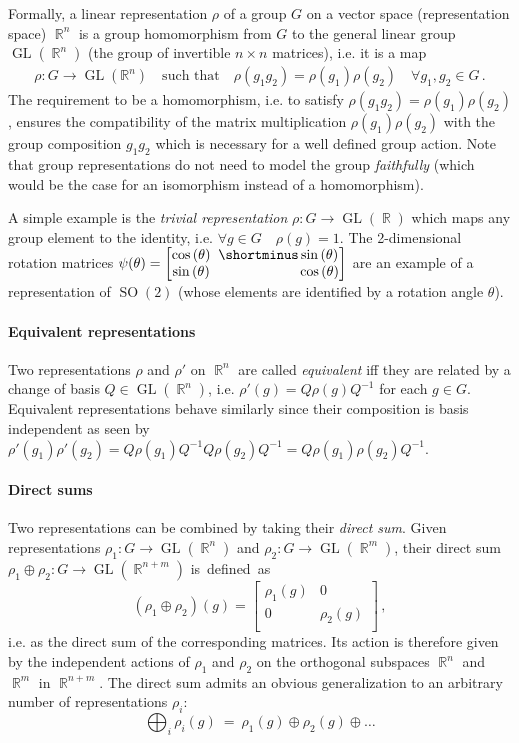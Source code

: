 \documentclass{article}
\newcommand{\lp}{\left(}
\newcommand{\rp}{\right)}
\DeclareMathOperator*{\R}{\mathbb{R}}
\newcommand{\GL}[1]{\ensuremath{\operatorname{GL}(#1)}}
\newcommand{\SO}[1]{\ensuremath{\operatorname{SO}(#1)}}
\newcommand{\PSI}[1]{
	\begin{bmatrix}
		\cos\lp#1\rp & \!\!\!         \shortminus \sin\lp#1\rp \\
		\sin\lp#1\rp & \!\!\!\phantom{\shortminus}\cos\lp#1\rp \\
	\end{bmatrix}
}
\begin{document}
Formally, a linear representation $\rho$ of a group $G$ on a vector space (representation space) $\R^n$ is a group homomorphism from $G$ to the general linear group $\GL{\R^n}$ (the group of invertible $n\times n$ matrices), i.e. it is a map
\begin{align*}
    \rho: G \to \operatorname{GL}(\mathbb{R}^n)
    \quad\text{such that}\quad
    \rho(g_1 g_2) = \rho(g_1) \rho(g_2) \quad \forall g_1, g_2 \in G \,.
\end{align*}
The requirement to be a homomorphism, i.e. to satisfy $\rho(g_1 g_2)=\rho(g_1)\rho(g_2)$, ensures the compatibility of the matrix multiplication $\rho(g_1)\rho(g_2)$ with the group composition $g_1 g_2$ which is necessary for a well defined group action.
Note that group representations do not need to model the group \textit{faithfully} (which would be the case for an isomorphism instead of a homomorphism).

A simple example is the \textit{trivial representation} $\rho:G\to\GL{\R}$ which maps any group element to the identity, i.e. $\forall g\in G\quad \rho(g)=1$.
The 2-dimensional rotation matrices $\psi(\theta)=\PSI{\theta}$ are an example of a representation of $\SO{2}$ (whose elements are identified by a rotation angle $\theta$).

\paragraph{Equivalent representations}
Two representations $\rho$ and $\rho'$ on $\R^n$ are called \textit{equivalent} iff they are related by a change of basis $Q\in\GL{\R^n}$, i.e. $\rho'(g) = Q \rho(g) Q^{-1}$ for each $g\in G$.
Equivalent representations behave similarly since their composition is basis independent as seen by $\rho'(g_1)\rho'(g_2) = Q\rho(g_1)Q^{-1}Q\rho(g_2)Q^{-1} = Q\rho(g_1)\rho(g_2)Q^{-1}$.

\paragraph{Direct sums}
Two representations can be combined by taking their \textit{direct sum}.
Given representations $\rho_1:G\to\GL{\R^n}$ and $\rho_2:G\to\GL{\R^m}$, their direct sum $\rho_1\oplus\rho_2:G\to\GL{\R^{n+m}}$ is~defined~as
\[
    (\rho_1 \oplus \rho_2)(g) = 
    \begin{bmatrix}
    \rho_1(g) & 0 		 \\
    0  		  & \rho_2(g)\\
    \end{bmatrix}\,,
\]
i.e. as the direct sum of the corresponding matrices.
Its action is therefore given by the independent actions of $\rho_1$ and $\rho_2$ on the orthogonal subspaces $\R^n$ and $\R^m$ in $\R^{n+m}$.
The direct sum admits an obvious generalization to an arbitrary number of representations $\rho_i$:
\[
    \bigoplus\nolimits_i \rho_i(g)\ =\ \rho_1(g) \oplus \rho_2(g) \oplus \dots
\]
\end{document}
